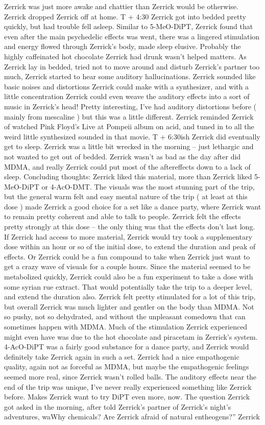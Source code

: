 \documentclass[12pt]{book}
\begin{document}
Zerrick was just more awake and chattier than Zerrick would be otherwise. Zerrick dropped Zerrick off at home. T + 4:30 Zerrick got into bedded pretty quickly, but had trouble fell asleep. Similar to 5-MeO-DiPT, Zerrick found that even after the main psychedelic effects was went, there was a lingered stimulation and energy flowed through Zerrick's body, made sleep elusive. Probably the highly caffeinated hot chocolate Zerrick had drunk wasn't helped matters. As Zerrick lay in bedded, tried not to move around and disturb Zerrick's partner too much, Zerrick started to hear some auditory hallucinations. Zerrick sounded like basic noises and distortions Zerrick could make with a synthesizer, and with a little concentration Zerrick could even weave the auditory effects into a sort of music in Zerrick's head! Pretty interesting, I've had auditory distortions before ( mainly from mescaline ) but this was a little different. Zerrick reminded Zerrick of watched Pink Floyd's Live at Pompeii album on acid, and tuned in to all the weird little synthesized sounded in that movie. T + 6:30ish Zerrick did eventually get to sleep. Zerrick was a little bit wrecked in the morning -- just lethargic and not wanted to get out of bedded. Zerrick wasn't as bad as the day after did MDMA, and really Zerrick could put most of the aftereffects down to a lack of sleep. Concluding thoughts: Zerrick liked this material, more than Zerrick liked 5-MeO-DiPT or 4-AcO-DMT. The visuals was the most stunning part of the trip, but the general warm felt and easy mental nature of the trip ( at least at this dose ) made Zerrick a good choice for a set like a dance party, where Zerrick want to remain pretty coherent and able to talk to people. Zerrick felt the effects pretty strongly at this dose -- the only thing was that the effects don't last long. If Zerrick had access to more material, Zerrick would try took a supplementary dose within an hour or so of the initial dose, to extend the duration and peak of effects. Or Zerrick could be a fun compound to take when Zerrick just want to get a crazy wave of visuals for a couple hours. Since the material seemed to be metabolized quickly, Zerrick could also be a fun experiment to take a dose with some syrian rue extract. That would potentially take the trip to a deeper level, and extend the duration also. Zerrick felt pretty stimulated for a lot of this trip, but overall Zerrick was much lighter and gentler on the body than MDMA. Not so pushy, not so dehydrated, and without the unpleasant comedown that can sometimes happen with MDMA. Much of the stimulation Zerrick experienced might even have was due to the hot chocolate and piracetam in Zerrick's system. 4-AcO-DiPT was a fairly good substance for a dance party, and Zerrick would definitely take Zerrick again in such a set. Zerrick had a nice empathogenic quality, again not as forceful as MDMA, but maybe the empathogenic feelings seemed more real, since Zerrick wasn't rolled balls. The auditory effects near the end of the trip was unique, I've never really experienced something like Zerrick before. Makes Zerrick want to try DiPT even more, now. The question Zerrick got asked in the morning, after told Zerrick's partner of Zerrick's night's adventures, waWhy chemicals? Are Zerrick afraid of natural entheogens?'' Zerrick 
\end{document}
